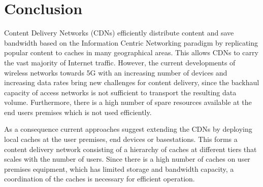 \chapter{Conclusion}\label{chap:conclusion}

Content Delivery Networks (CDNs) efficiently distribute content and save bandwidth based on the Information Centric Networking paradigm by replicating popular content to caches in many geographical areas.
This allows CDNs to carry the vast majority of Internet traffic.
However, the current developments of wireless networks towards 5G with an increasing number of devices and increasing data rates bring new challenges for content delivery, since the backhaul capacity of access networks is not sufficient to transport the resulting data volume.
Furthermore, there is a high number of spare resources available at the end users premises which is not used efficiently.

As a consequence current approaches suggest extending the CDNs by deploying local caches at the user premises, end devices or basestations.
This forms a content delivery network consisting of a hierarchy of caches at different tiers that scales with the number of users.
Since there is a high number of caches on user premises equipment, which has limited storage and bandwidth capacity, a coordination of the caches is necessary for efficient operation.

